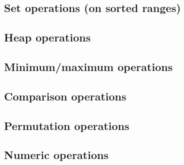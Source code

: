 \subsection{Set operations (on sorted ranges)}

\subsection{Heap operations}

\subsection{Minimum/maximum operations}

\subsection{Comparison operations}

\subsection{Permutation operations}

\subsection{Numeric operations}



